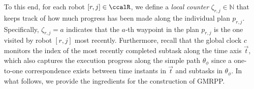 \documentclass[Afour,sageh,times]{sagej}
\newcommand{\auto}[1]{\ccalA_{\textup{#1}}}
\newcommand{\autop}{\ccalA_{\phi}}
\newcommand{\domanda}[1]{\subsubsection*{#1}}
\begin{document}
{{ To this end, for each robot $[r,j] \in \ccalR$, we define a {\it local counter} $\zeta_{r,j} \in \mathbb{N}$  that  keeps track of how much progress has been made along the individual plan $p_{r,j}$. Specifically, $\zeta_{r,j} = a$ indicates that the $a$-th waypoint in the plan $p_{r,j}$ is the one  visited by  robot $[r,j]$  most recently. Furthermore, recall that the  global clock $c$ monitors the index of the most recently completed subtask  along the time axis $\vec{t}$, which also captures the execution progress along the simple path  $\theta_{\phi}$ since a one-to-one correspondence exists between time instants in $\vec{t}$ and subtasks in $\theta_\phi$. In what follows, we provide the ingredients for the construction of GMRPP.



}}
\end{document}
